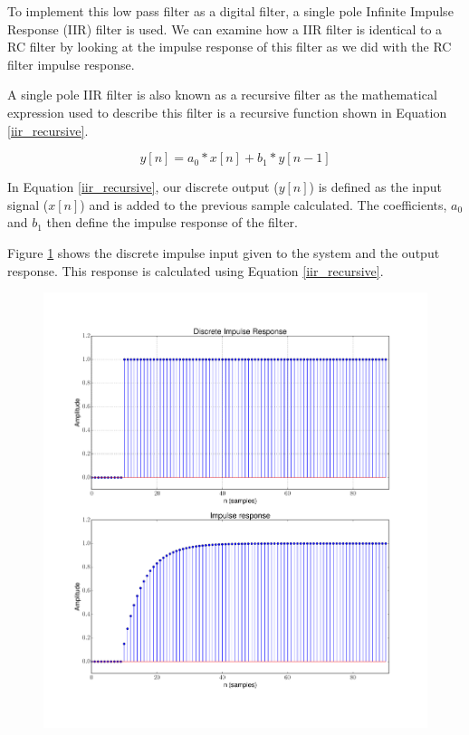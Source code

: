 To implement this low pass filter as a digital filter, a single pole Infinite Impulse Response (IIR) filter is used.  We can examine how a IIR filter is identical to a RC filter by looking at the impulse response of this filter as we did with the RC filter impulse response.

A single pole IIR filter is also known as a recursive filter as the mathematical expression used to describe this filter is a recursive function shown in Equation \ref{iir_recursive}.  

\begin{equation}\label{iir_recursive}
y[n] = a_0 * x[n] + b_1 * y[n-1]
\end{equation}

In Equation \ref{iir_recursive}, our discrete output ($y[n]$) is defined as the input signal ($x[n]$) and is added to the previous sample calculated.  The coefficients, $a_0$ and $b_1$ then define the impulse response of the filter.

Figure \ref{iir_response} shows the discrete impulse input given to the system and the output response.  This response is calculated using Equation \ref{iir_recursive}.

{\begin{figure}[h!tb] 
\centering
\includegraphics[width=17cm]{Experiments/Exp6/iir_response.pdf}
\label{iir_response}
\end{figure}
}

